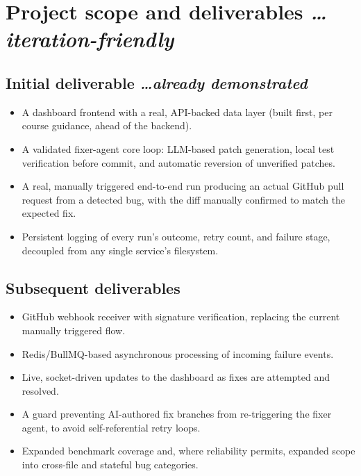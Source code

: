 \documentclass[11pt,a4paper]{article}
\newcommand{\BvrHint}[1]{%
  {\normalfont\normalsize\itshape\hfill #1}}
\begin{document}
\section{Project scope and deliverables %
\BvrHint{\ldots iteration-friendly}}
\subsection{Initial deliverable %
\BvrHint{\ldots already demonstrated}}
\begin{itemize}[leftmargin=0.7cm]
    \item A dashboard frontend with a real, API-backed data layer
      (built first, per course guidance, ahead of the backend).
    \item A validated fixer-agent core loop: LLM-based patch
      generation, local test verification before commit, and
      automatic reversion of unverified patches.
    \item A real, manually triggered end-to-end run producing an
      actual GitHub pull request from a detected bug, with the
      diff manually confirmed to match the expected fix.
    \item Persistent logging of every run's outcome, retry count,
      and failure stage, decoupled from any single service's
      filesystem.
\end{itemize}

\subsection{Subsequent deliverables}
\begin{itemize}[leftmargin=0.7cm]
    \item GitHub webhook receiver with signature verification,
      replacing the current manually triggered flow.
    \item Redis/BullMQ-based asynchronous processing of incoming
      failure events.
    \item Live, socket-driven updates to the dashboard as fixes are
      attempted and resolved.
    \item A guard preventing AI-authored fix branches from
      re-triggering the fixer agent, to avoid self-referential
      retry loops.
    \item Expanded benchmark coverage and, where reliability
      permits, expanded scope into cross-file and stateful bug
      categories.
\end{itemize}
\end{document}
